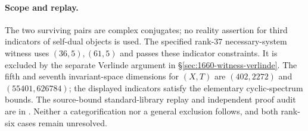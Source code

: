 \paragraph{Scope and replay.}
The two surviving pairs are complex conjugates; no reality assertion
for third indicators of self-dual objects is used. The specified
rank-$37$ necessary-system witness uses
$(36,5),(61,5)$ and passes these indicator constraints. It is excluded
by the separate Verlinde argument in \S\ref{sec:1660-witness-verlinde}.
The fifth and seventh invariant-space
dimensions for $(X,T)$ are $(402,2272)$ and $(55401,626784)$;
the displayed indicators satisfy the elementary cyclic-spectrum bounds.
The source-bound standard-library replay and independent proof audit are
in .
Neither a categorification nor a general exclusion follows, and both
rank-six cases remain unresolved.
